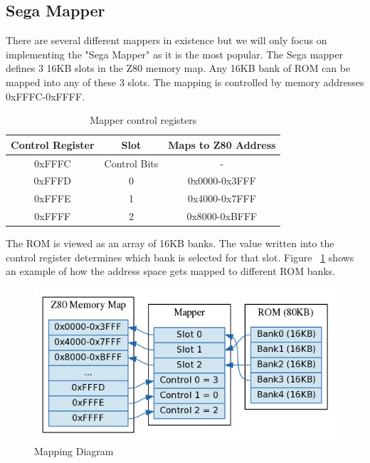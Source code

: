\documentclass{article}
\begin{document}
\subsection{Sega Mapper}
There are several different mappers in existence but we will only
focus on implementing the "Sega Mapper" as it is the most popular.
The Sega mapper defines 3 16KB slots in the Z80 memory map. Any 16KB bank
of ROM can be mapped into any of these 3 slots. The mapping is
controlled by memory addresses 0xFFFC-0xFFFF.

\begin{table}[!htbp]
    \centering
    \begin{tabular}{|c|c|c|}
        \hline
        \textbf{Control Register} & \textbf{Slot}     & \textbf{Maps to Z80 Address} \\ \hline
        0xFFFC           & Control Bits & -              \\ \hline
        0xFFFD           & 0            & 0x0000-0x3FFF  \\ \hline
        0xFFFE           & 1            & 0x4000-0x7FFF  \\ \hline
        0xFFFF           & 2            & 0x8000-0xBFFF  \\
        \hline
    \end{tabular}
    \caption{Mapper control registers \protect\cite{mapper}}
\end{table}

The ROM is viewed as an array of 16KB banks. The value written into 
the control register determines which bank is selected for 
that slot. Figure ~\ref{fig:mapping_diagram} shows an example of 
how the address space gets mapped to different ROM banks.

\begin{figure}[H]
\centering
\includegraphics[scale=0.4]{mapper.png}
\caption{Mapping Diagram}
\label{fig:mapping_diagram}
\end{figure}
\end{document}
